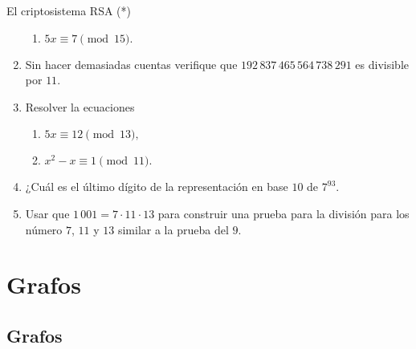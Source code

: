 \begin{section}{El criptosistema RSA (*)}
\begin{enumerate}
\begin{enumerate}
    \item  $5x\equiv 7 \pmod{15}.$
\end{enumerate}
\item Sin hacer demasiadas cuentas verifique que
$192\,837\,465\,564\,738\,291$ es divisible por $11$.
\item Resolver la ecuaciones
\begin{enumerate}
\item $5x\equiv12 \pmod{13},$

\item $x^2-x \equiv 1 \pmod{11}.$
\end{enumerate}
%
\item ¿Cuál es el último dígito de la representación en base $10$ de
$7^{93}$.
\item Usar que $1\,001=7\cdot 11 \cdot 13$ para construir una prueba
para la división para los número $7$, $11$ y $13$ similar a la prueba
del $9$.
\end{enumerate}
\end{section}


\part{Grafos} 


\chapter[Grafos]{Grafos}\label{cap.grafos}


